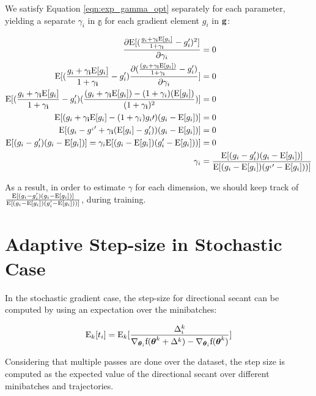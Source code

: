 \documentclass{article}
\begin{document}
We satisfy Equation \ref{eqn:exp_gamma_opt} separately for each parameter,
yielding a separate $\gamma_i$ in $\mathbb{\gamma}$ for each gradient element $g_i$ in
$\mathbf{g}$:

\begin{align}
\label{eqn:exp_gamma_opt2}
\frac{\partial \mathrm{E}[(\frac{g_i+\mathbf{\gamma_i}\mathrm{E}[g_i]}{1+\mathbf{\gamma_i}} - g_i^{\prime})^2]}{\partial \gamma_i}&=0 \\
\mathrm{E}[(\frac{g_i + \mathbf{\gamma_i}\mathrm{E}[g_i] }{1+\mathbf{\gamma_i}} - g_i^{\prime}) \frac{\partial (\frac{(g_i+\mathbf{\gamma_i}\mathrm{E}[g_i])}{1+\mathbf{\gamma_i}} - g_i^{\prime})}{\partial \gamma_i}]&=0 \\
\mathrm{E}[(\frac{g_i + \mathbf{\gamma_i} \mathrm{E}[g_i]}{1 + \mathbf{\gamma_i}} - g_i^{\prime}) 
(\frac{(g_i+\mathbf{\gamma_i}\mathrm{E}[g_i])-(1+\gamma_i)(\mathrm{E}[g_i])}{(1 + \mathbf{\gamma_i})^2})]&=0 \\
\mathrm{E}[(g_i + \mathbf{\gamma_i} \mathrm{E}[g_i] - (1+\gamma_i)g_i{\prime})(g_i - \mathrm{E}[g_i])]&=0 \\
\mathrm{E}[(g_i - g^{_i\prime} +\mathbf{\gamma_i}(\mathrm{E}[g_i]-g_i^{\prime}))(g_i - \mathrm{E}[g_i])]&=0 \\
\mathrm{E}[(g_i - g_i^{\prime})(g_i - \mathrm{E}[g_i])] = \gamma_i \mathrm{E}[(g_i-\mathrm{E}[g_i])(g_i^{\prime}-\mathrm{E}[g_i]))]&=0 \\
\gamma_i &= \frac{\mathrm{E}[(g_i - g_i^{\prime})(g_i - \mathrm{E}[g_i])]}{\mathrm{E}[(g_i-\mathrm{E}[g_i])(g^{_i\prime}-\mathrm{E}[g_i]))]}
\end{align}

As a result, in order to estimate $\gamma$ for each dimension, we should keep track of $\frac{\mathrm{E}[(g_i - g_i^{\prime})(g_i - \mathrm{E}[g_i])]}{\mathrm{E}[(g_i - \mathrm{E}[g_i])(g_i^{\prime}-\mathrm{E}[g_i]))]}$, 
during training.

\section{Adaptive Step-size in Stochastic Case}

In the stochastic gradient case, the step-size for directional secant can be computed by using an expectation over the minibatches:

\begin{equation}
\label{eqn:adapt_stepsize}
\mathrm{E}_k[t_{i}] = \mathrm{E}_k[\frac{\Delta_i^k}{\nabla_{{\boldsymbol{\theta}}_i} \text{f}({\boldsymbol{\theta}}^k +  \Delta^k) - \nabla_{{\boldsymbol{\theta}}_i} \text{f}({\boldsymbol{\theta}}^k)}]
\end{equation}

Considering that multiple passes are done over the dataset, the step size is computed as the expected value
of the directional secant over different minibatches and trajectories.
\end{document}
